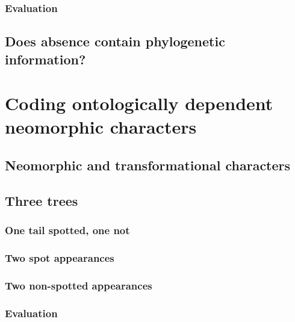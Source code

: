 \documentclass[]{book}
\theoremstyle{definition}
\theoremstyle{definition}
\theoremstyle{definition}
\theoremstyle{remark}
\begin{document}
\hypertarget{evaluation}{%
\subsubsection{Evaluation}\label{evaluation}}

\hypertarget{does-absence-contain-phylogenetic-information}{%
\subsection{Does absence contain phylogenetic
information?}\label{does-absence-contain-phylogenetic-information}}

\hypertarget{neomorphics}{%
\section{Coding ontologically dependent neomorphic
characters}\label{neomorphics}}

\hypertarget{neomorphic-and-transformational-characters}{%
\subsection{Neomorphic and transformational
characters}\label{neomorphic-and-transformational-characters}}

\hypertarget{three-trees}{%
\subsection{Three trees}\label{three-trees}}

\hypertarget{one-tail-spotted-one-not}{%
\subsubsection{One tail spotted, one
not}\label{one-tail-spotted-one-not}}

\hypertarget{two-spot-appearances}{%
\subsubsection{Two spot appearances}\label{two-spot-appearances}}

\hypertarget{two-non-spotted-appearances}{%
\subsubsection{Two non-spotted
appearances}\label{two-non-spotted-appearances}}

\hypertarget{evaluation-1}{%
\subsubsection{Evaluation}\label{evaluation-1}}
\end{document}
